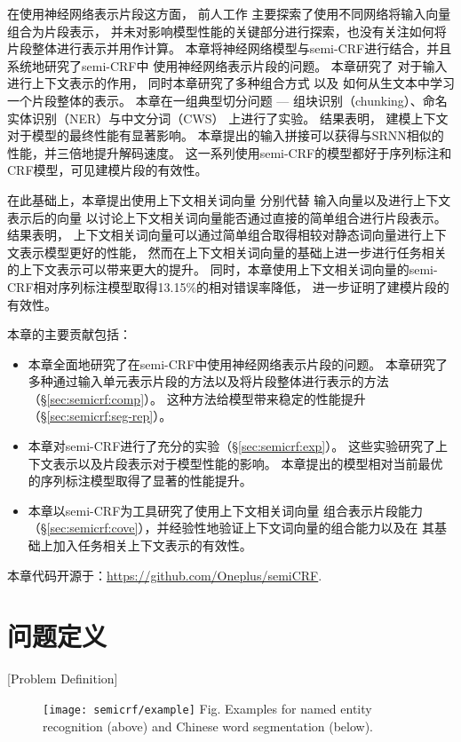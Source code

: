 在使用神经网络表示片段这方面，
前人工作\cite{DBLP:journals/corr/KongDS15,zhuo-EtAl:2016:P16-1}
主要探索了使用不同网络将输入向量组合为片段表示，
并未对影响模型性能的关键部分进行探索，也没有关注如何将片段整体进行表示并用作计算。
本章将神经网络模型与semi-CRF进行结合，并且系统地研究了semi-CRF中
使用神经网络表示片段的问题。
本章研究了
对于输入进行上下文表示的作用，
同时本章研究了多种组合方式
以及
如何从生文本中学习一个片段整体的表示。
本章在一组典型切分问题 --- 组块识别（chunking）、命名实体识别（NER）与中文分词（CWS）
上进行了实验。
结果表明，
建模上下文对于模型的最终性能有显著影响。
本章提出的输入拼接可以获得与SRNN相似的性能，并三倍地提升解码速度。
这一系列使用semi-CRF的模型都好于序列标注和CRF模型，可见建模片段的有效性。

在此基础上，本章提出使用上下文相关词向量
分别代替
输入向量以及进行上下文表示后的向量
以讨论上下文相关词向量能否通过直接的简单组合进行片段表示。
结果表明，
上下文相关词向量可以通过简单组合取得相较对静态词向量进行上下文表示模型更好的性能，
然而在上下文相关词向量的基础上进一步进行任务相关的上下文表示可以带来更大的提升。
同时，本章使用上下文相关词向量的semi-CRF相对序列标注模型取得13.15\%的相对错误率降低，
进一步证明了建模片段的有效性。

本章的主要贡献包括：
\begin{itemize}
	\item 本章全面地研究了在semi-CRF中使用神经网络表示片段的问题。
	本章研究了多种通过输入单元表示片段的方法以及将片段整体进行表示的方法（\S\ref{sec:semicrf:comp}）。
	这种方法给模型带来稳定的性能提升（\S\ref{sec:semicrf:seg-rep}）。
	\item 本章对semi-CRF进行了充分的实验（\S\ref{sec:semicrf:exp}）。
	这些实验研究了上下文表示以及片段表示对于模型性能的影响。
	本章提出的模型相对当前最优的序列标注模型取得了显著的性能提升。
	\item 本章以semi-CRF为工具研究了使用上下文相关词向量
	组合表示片段能力（\S\ref{sec:semicrf:cove}），并经验性地验证上下文词向量的组合能力以及在
	其基础上加入任务相关上下文表示的有效性。
\end{itemize}

本章代码开源于：\url{https://github.com/Oneplus/semiCRF}.

\section{问题定义}[Problem Definition]
\begin{figure}[t]
	\centering
	\texttt{[image: semicrf/example]}
	{Fig. $\!$}{Examples for named entity recognition (above) and Chinese word segmentation (below).\label{fig:semicrf:ne-and-cws}}
\end{figure}

